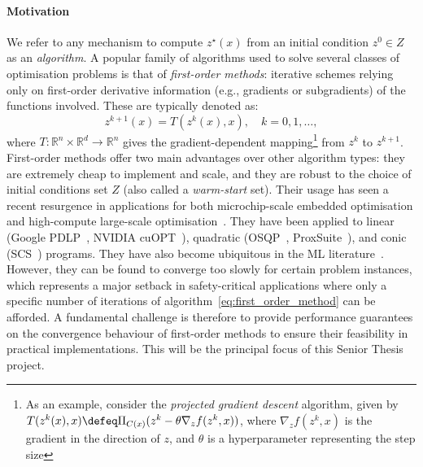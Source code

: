 \paragraph{Motivation}

We refer to any mechanism to compute $z^\star(x)$ from an initial condition $z^0 \in Z$ as an \emph{algorithm}. A popular family of algorithms used to solve several classes of optimisation problems is that of \textit{first-order methods}: iterative schemes relying only on first-order derivative information (e.g., gradients or subgradients) of the functions involved. 
These are typically denoted as:
\begin{equation}\label{eq:first_order_method}
  z^{k+1}(x) = T(z^k(x), x),\quad k=0,1,\dots,
\end{equation}
where $T: \mathbb{R}^n \times \mathbb{R}^d \rightarrow \mathbb{R}^n$ gives the gradient-dependent mapping\footnote{
As an example, consider the \textit{projected gradient descent} algorithm, given by $T(z^k(x), x) \defeq \Pi_{C(x)}(z^k-\theta\nabla_zf(z^k,x))$, where $\nabla_zf(z^k,x)$ is the gradient in the direction of $z$, and $\theta$ is a hyperparameter representing the step size} 
from $z^k$ to $z^{k+1}$. First-order methods offer two main advantages over other algorithm types: they are extremely cheap to implement and scale, and they are robust to the choice of initial conditions set $Z$ (also called a \textit{warm-start} set). Their usage has seen a recent resurgence in applications for both microchip-scale embedded optimisation and high-compute large-scale optimisation~\cite{StellatoPresentation2025}. They have been applied to linear (Google PDLP~\cite{googlePDLP}, NVIDIA cuOPT~\cite{NVIDIAcuopt}), quadratic (OSQP~\cite{stellato2020osqp}, ProxSuite~\cite{proxsuite}), and conic (SCS~\cite{SCSconic}) programs. They have also become ubiquitous in the ML literature~\cite{ruder2016overview}. However, they can be found to converge too slowly for certain problem instances, which represents a major setback in safety-critical applications where only a specific number of iterations of algorithm~\eqref{eq:first_order_method} can be afforded. A fundamental challenge is therefore to provide performance guarantees on the convergence behaviour of first-order methods to ensure their feasibility in practical implementations. This will be the principal focus of this Senior Thesis project.